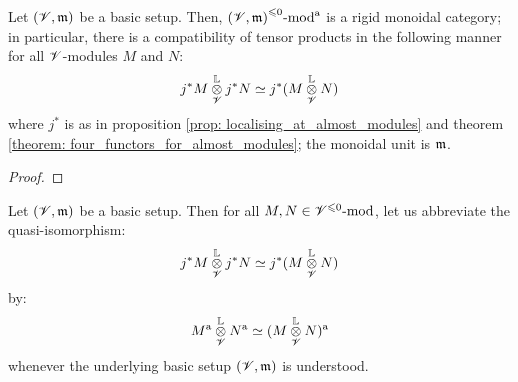                     \begin{proposition} \label{prop: tensor_products_of_almost_modules}
                        Let $(\mathscr{V}, \mathfrak{m})$ be a basic setup. Then, ${(\mathscr{V}, \mathfrak{m})}^{\leqslant 0}\text{-}\mathrm{mod}^{\mathrm{a}}$ is a rigid monoidal category; in particular, there is a compatibility of tensor products in the following manner for all $\mathscr{V}$-modules $M$ and $N$:
                            $$j^*M \tensor^{\L}_{\scrV} j^*N \cong j^*(M \tensor^{\L}_{\scrV} N)$$
                        where $j^*$ is as in proposition \ref{prop: localising_at_almost_modules} and theorem \ref{theorem: four_functors_for_almost_modules}; the monoidal unit is $\mathfrak{m}$.
                    \end{proposition}
                        \begin{proof}
                            
                        \end{proof}
                    \begin{convention} \label{conv: almost_tensor_products}
                        Let $(\mathscr{V}, \mathfrak{m})$ be a basic setup. Then for all $M, N \in {\mathscr{V}}^{\leqslant 0}\text{-}\mathrm{mod}$, let us abbreviate the quasi-isomorphism:
                            $$j^*M \tensor^{\L}_{\scrV} j^*N \cong j^*(M \tensor^{\L}_{\scrV} N)$$
                        by:
                            $$M^{\almost} \tensor^{\L}_{\scrV} N^{\almost} \cong (M \tensor^{\L}_{\scrV} N)^{\almost}$$
                        whenever the underlying basic setup $(\mathscr{V}, \mathfrak{m})$ is understood.
                    \end{convention}
